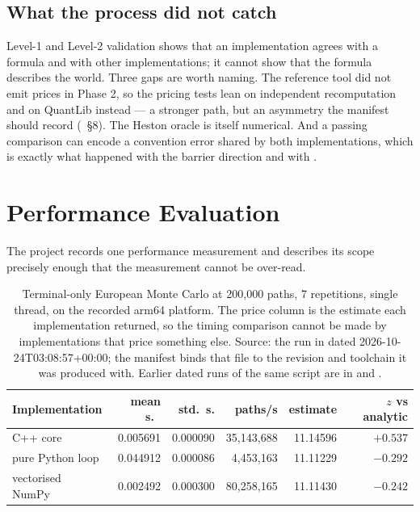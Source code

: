 \documentclass[11pt,a4paper]{article}
\begin{document}
\subsection{What the process did not catch}
Level-1 and Level-2 validation shows that an implementation agrees with a formula and with other
implementations; it cannot show that the formula describes the world. Three gaps are worth
naming. The reference tool did not emit prices in Phase 2, so the pricing tests lean on
independent recomputation and on QuantLib instead --- a stronger path, but an asymmetry the
manifest should record (~\S8). The
Heston oracle is itself numerical. And a passing comparison can encode a convention error shared
by both implementations, which is exactly what happened with the barrier direction and with
.

\section{Performance Evaluation}
\label{sec:performance}

The project records one performance measurement and describes its scope precisely enough that
the measurement cannot be over-read.

\begin{table}[t]
\caption[Terminal-only European Monte Carlo at 200{,}000 paths, 7 repetitions, single thr]{Terminal-only European Monte Carlo at 200{,}000 paths, 7 repetitions, single
thread, on the recorded arm64 platform. The price column is the estimate each implementation
returned, so the timing comparison cannot be made by implementations that price something else.
Source: the run in
 dated
2026-10-24T03:08:57+00:00; the manifest binds that file to the revision and toolchain it was
produced with. Earlier dated runs of the same script are in
 and
.}
\label{tab:speed}
\centering\small
\begin{tabular}{lrrrrr}
\toprule
Implementation & mean s.\ & std.\ s. & paths/s & estimate & $z$ vs analytic \\
\midrule
C++ core & 0.005691 & 0.000090 & 35{,}143{,}688 & 11.14596 & $+0.537$ \\
pure Python loop & 0.044912 & 0.000086 & 4{,}453{,}163 & 11.11229 & $-0.292$ \\
vectorised NumPy & 0.002492 & 0.000300 & 80{,}258{,}165 & 11.11430 & $-0.242$ \\
\bottomrule
\end{tabular}
\end{table}
\end{document}
